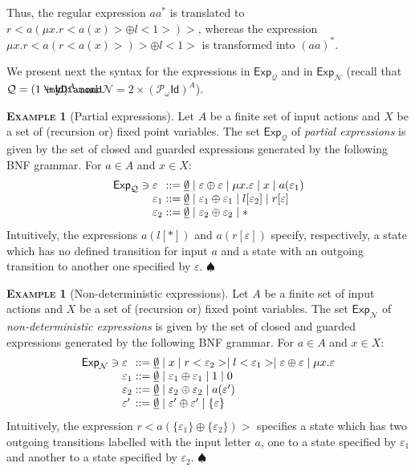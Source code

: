 \documentclass{LMCS}
\newcommand\N{\mathcal{N}}
\newcommand\Pa{\mathcal{Q}}
\def\pow{{\mathcal P_{\!\!\!\omega}}}
\newcommand\E\varepsilon
\newcommand\Exp{\mathsf{Exp}}
\newcommand\id{\mathsf{Id}}
\newcommand\emp{\underline\emptyset}
\newcommand{\myplus}{\mathbin{\rlap{$\myDiamond$}\hspace*{.01cm}\raisebox{.14ex}{$+$}}}
\def\hyph{-\penalty0\hskip0pt\relax}
\theoremstyle{definition}
\theoremstyle{plain}
\theoremstyle{plain}
\theoremstyle{plain}
\theoremstyle{plain}
\theoremstyle{definition}
\theoremstyle{definition}
\newtheorem{myexample}[mydefinition]{\textsc{Example}}
\newenvironment{example}{
\begin{myexample}}
    {\hfill$\spadesuit$\end{myexample}}
\begin{document}
Thus, the regular expression $aa^*$  is translated to $r<a(\mu x. r<a(x)> \oplus l<1>)>$, 
whereas the expression $\mu x. r<a(r<a(x)>)> \oplus l<1>$ is transformed into $(aa)^*$.

We present next the syntax for the
expressions in $\Exp_\Pa$ and in $\Exp_\N$ (recall that
$\Pa=(1\myplus\id)^A$ and $\N=2\times (\pow\id)^A$).

\begin{example}[Partial expressions]
Let $A$ be a finite set of input actions and $X$ be a set of (recursion or)
fixed point variables. The set $\Exp_\Pa$ of {\em partial expressions\/} is given by the set of closed and guarded expressions generated by the following BNF grammar. For $a \in A$ and $x \in X$:
\[
\begin{array} {l@{\;}l@{\;}c@{\;}l}
\Exp_\Pa\ni &\E &::=& \emp \mid  \E \oplus \E \mid 
         \mu x.\E \mid  x \mid 
         a(\E_1)\\
& \E_1&::=& \emp \mid \E_1\oplus \E_1   \mid l[\E_2] \mid r[\E] \\   
& \E_2 &::=& \emp \mid \E_2\oplus \E_2 \mid * 
\end{array}
\]
Intuitively, the expressions $a(l[*])$ and $a(r[\E])$ specify,
respectively, a state which has no
defined transition for input $a$ and a state with an outgoing
transition to another one specified by $\E$.  
\end{example}
\begin{example}[Non-deterministic expressions]
Let $A$ be a finite set of input actions and $X$ be a set of (recursion or)
fixed point variables. The set $\Exp_\N$ of {\em non\hyph deterministic expressions\/} is given by the set of closed and guarded expressions generated by the following BNF grammar. For $a \in A$ and $x \in X$:
\[
\begin{array} {l@{\;}l@{\;}c@{\;}l}
\Exp_\N \ni& \E &::=&  \emp \mid x \mid 
         r<\E_2> \mid  l<\E_1> \mid 
         \E \oplus \E \mid 
         \mu x.\E\\
&\E_1 &::=&  \emp \mid \E_1 \oplus \E_1 \mid 1 \mid 0\\
&\E_2 &::=&  \emp \mid \E_2 \oplus \E_2 \mid a(\E')\\
&\E' &::=&  \emp \mid \E' \oplus \E' \mid \{\E\}
\end{array}
\]
Intuitively, the expression $r<a(\{\E_1\}\oplus \{\E_2\})>$ specifies a
state which has two outgoing transitions labelled with the input letter $a$, one to a
state specified by $\E_1$ and another to a state specified by $\E_2$.
\end{example}
\end{document}
